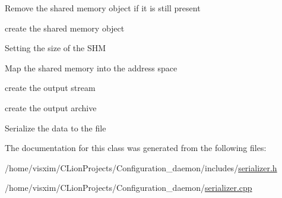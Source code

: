 Remove the shared memory object if it is still present

create the shared memory object

Setting the size of the S\+HM

Map the shared memory into the address space

create the output stream

create the output archive

Serialize the data to the file 

The documentation for this class was generated from the following files\+:\begin{DoxyCompactItemize}
\item 
/home/visxim/\+C\+Lion\+Projects/\+Configuration\+\_\+daemon/includes/\hyperlink{serializer_8h}{serializer.\+h}\item 
/home/visxim/\+C\+Lion\+Projects/\+Configuration\+\_\+daemon/\hyperlink{serializer_8cpp}{serializer.\+cpp}\end{DoxyCompactItemize}

